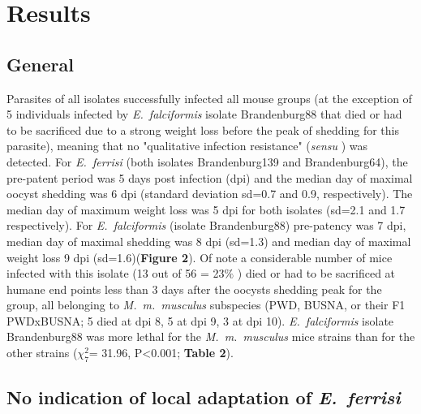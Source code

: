 \documentclass[12pt]{article}
\begin{document}
\section*{Results}
\setcounter{subsection}{0}
\renewcommand*{\theHsubsection}{chX.\the\value{subsection}}

\subsection{General}

Parasites of all isolates successfully infected all mouse groups (at the exception of 5 individuals infected by \textit{E.~falciformis} isolate Brandenburg88 that died or had to be sacrificed due to a strong weight loss before the peak of shedding for this parasite), meaning that no "qualitative infection resistance" (\textit{sensu} \cite{Gandon2000}) was detected. For \textit{E.~ferrisi }(both isolates Brandenburg139 and Brandenburg64), the pre-patent period was 5 days post infection (dpi) and the median day of maximal oocyst shedding was 6 dpi (standard deviation sd=0.7 and 0.9, respectively). The median day of maximum weight loss was 5 dpi for both isolates (sd=2.1 and 1.7 respectively). For \textit{E.~falciformis} (isolate Brandenburg88) pre-patency was 7 dpi, median day of maximal shedding was 8 dpi (sd=1.3) and median day of maximal weight loss 9 dpi (sd=1.6)(\textbf{Figure 2}). Of note a considerable number of mice infected with this isolate (13 out of 56 = 23$\%$ ) died or had to be sacrificed at humane end points less than 3 days after the oocysts shedding peak for the group, all belonging to \textit{M.~m.~musculus} subspecies (PWD, BUSNA, or their F1 PWDxBUSNA; 5 died at dpi 8, 5 at dpi 9, 3 at dpi 10). \textit{E.~falciformis }isolate Brandenburg88 was more lethal for the \textit{M.~m.~musculus} mice strains than for the other strains ($\chi_{7}^{2}$= 31.96, P<0.001; \textbf{Table 2}).\par

\subsection{No indication of local adaptation of \textit{E.~ferrisi}}
\end{document}
